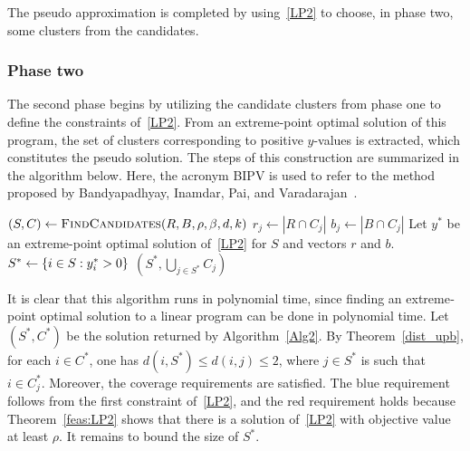 The pseudo approximation is completed by using~\ref{LP2} to choose, in phase two, some clusters from the candidates.

\subsubsection{Phase two}

The second phase begins by utilizing the candidate clusters from phase one to define the constraints of~\ref{LP2}. 
From an extreme-point optimal solution of this program, the set of clusters corresponding to positive $y$-values is extracted, which constitutes the pseudo solution. The steps of this construction are summarized in the algorithm below. Here, the acronym BIPV is used to refer to the method proposed by Bandyapadhyay, Inamdar, Pai, and Varadarajan~\cite{BIPV2019}.

\begin{algorithm}
    \caption{\sc BIPV\((R,B,\rho,\beta,d,k)\)}
    \label{Alg2}
    \begin{algorithmic}[1]
        \State $\left(S,C\right) \gets \text{\sc FindCandidates}(R,B,\rho,\beta,d,k)$
        \State $r_j \gets |R \cap C_j|$
        \State $b_j \gets |B \cap C_j|$
        \EndFor
        \State Let $y^*$ be an extreme-point optimal solution of~\ref{LP2} for $S$ and vectors $r$ and $b$.
        \State $S^* \gets \left\{i \in S : y_i^* > 0\right\}$
        \State \Return $\left(S^*,\bigcup_{j\in S^*}C_j\right)$
    \end{algorithmic}
\end{algorithm}
It is clear that this algorithm runs in polynomial time, since finding an extreme‐point optimal solution to a linear program can be done in polynomial time.
Let $\left(S^*,C^*\right)$ be the solution returned by {Algorithm~\ref{Alg2}}. 
By Theorem~\ref{dist_upb}, for each $i \in C^*$, one has ${d(i,S^*) \leq d(i,j) \leq 2}$, where $j \in S^*$ is such that $i \in C_j^*$. 
Moreover, the coverage requirements are satisfied. 
The blue requirement follows from the first constraint of~\ref{LP2}, and the red requirement holds because Theorem~\ref{feas:LP2} shows that there is a solution of~\ref{LP2} with objective value at least $\rho$. It remains to bound the size of $S^*$.

